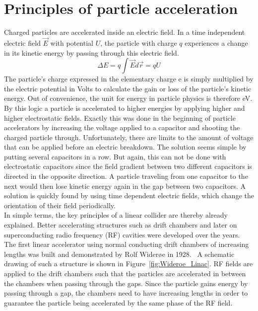 \section{Principles of particle acceleration}
\label{AccPhysics:Principles}
Charged particles are accelerated inside an electric field. 
In a time independent electric field $\vec{E}$ with potential $U$, the particle with charge $q$ experiences a change in its kinetic energy by passing through this electric field.
\begin{equation}
 \Delta E = q \int \vec{E}d\vec{r} = qU
\end{equation}
The particle's charge expressed in the elementary charge e is simply multiplied by the electric potential in Volts to calculate the gain or loss of the particle's kinetic energy. 
Out of convenience, the unit for energy in particle physics is therefore eV.\\
By this logic a particle is accelerated to higher energies by applying higher and higher electrostatic fields. 
Exactly this was done in the beginning of particle accelerators by increasing the voltage applied to a capacitor and shooting the charged particle through. 
Unfortunately, there are limits to the amount of voltage that can be applied before an electric breakdown.
The solution seems simple by putting several capacitors in a row.
But again, this can not be done with electrostatic capacitors since the field gradient between two different capacitors is directed in the opposite direction.
A particle traveling from one capacitor to the next would then lose kinetic energy again in the gap between two capacitors.
A solution is quickly found by using time dependent electric fields, which change the orientation of their field periodically.\\
In simple terms, the key principles of a linear collider are thereby already explained.
Better accelerating structures such as drift chambers and later on superconducting radio frequency (RF) cavities were developed over the years.
The first linear accelerator using normal conducting drift chambers of increasing lengths was built and demonstrated by Rolf Wider\o e in 1928.~\cite[p. 6]{Wilson}
A schematic drawing of such a structure is shown in Figure~\ref{fig:Wideroe_Linac}.
RF fields are applied to the drift chambers such that the particles are accelerated in between the chambers when passing through the gaps.
Since the particle gains energy by passing through a gap, the chambers need to have increasing lengths in order to guarantee the particle being accelerated by the same phase of the RF field.
